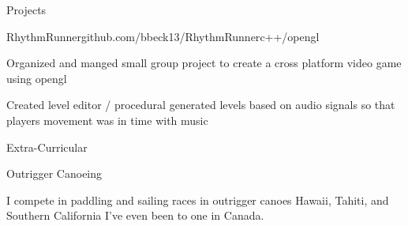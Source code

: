 \documentclass{resume} %
\begin{document}
\begin{rSection}{Projects} \itemsep -2pt
\begin{rSubsection}{RhythmRunner}{github.com/bbeck13/RhythmRunner}{c++/opengl}{}
\item Organized and manged small group project to create a cross platform video game using opengl
\item Created level editor / procedural generated levels based on audio signals so that players movement was in time with music

\end{rSubsection}

\end{rSection}

\begin{rSection}{Extra-Curricular}
\begin{rSubsection} {Outrigger Canoeing}{}{}{}
\item I compete in paddling and sailing races in outrigger canoes Hawaii, Tahiti, and Southern California I've even been to one in Canada.
\end{rSubsection}
\end{rSection}
\end{document}
